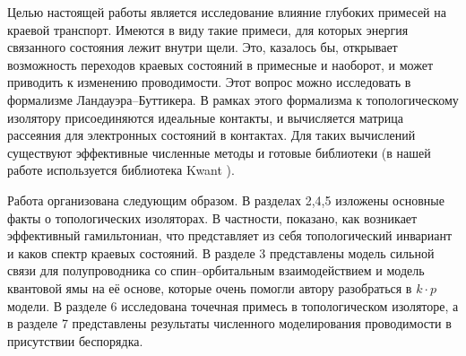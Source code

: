     Целью настоящей работы является исследование влияние глубоких примесей на краевой 
    транспорт. Имеются в виду такие примеси, для которых энергия связанного состояния
    лежит внутри щели. Это, казалось бы, открывает возможность переходов краевых
    состояний в примесные и наоборот, и может приводить к изменению проводимости. Этот вопрос
    можно исследовать в формализме Ландауэра--Буттикера. В рамках этого формализма к 
    топологическому изолятору присоединяются идеальные контакты, и вычисляется матрица
    рассеяния для электронных состояний в контактах. Для таких вычислений существуют 
    эффективные численные методы и готовые библиотеки 
    (в нашей работе используется библиотека Kwant \cite{Groth2014}).

    Работа организована следующим образом. В разделах 2,4,5 изложены основные факты о
    топологических изоляторах. В частности, показано, как возникает эффективный гамильтониан, 
    что представляет из себя топологический инвариант и каков спектр краевых состояний. В 
    разделе 3 представлены модель сильной связи для полупроводника со спин--орбитальным
    взаимодействием и модель квантовой ямы на её основе, которые очень помогли автору
    разобраться в $k\cdot p$ модели.
    В разделе 6 исследована точечная примесь в топологическом изоляторе, а в разделе 7 
    представлены результаты численного моделирования проводимости в присутствии беспорядка. 
    

    

    


    
